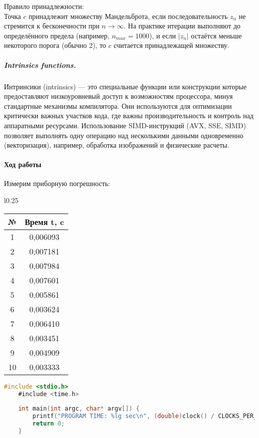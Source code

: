 \documentclass[12pt, letterpaper]{article}
\begin{document}
    Правило принадлежности:\\
    Точка $c$ принадлежит множеству Мандельброта, если последовательность $z_n$ не стремится к бесконечности при $n \to \infty$. На практике итерации выполняют до определённого предела (например, $n_{max} = 1000$), и если $\left| z_n \right|$ остаётся меньше некоторого порога (обычно 2), то $c$ считается принадлежащей множеству.

    \subparagraph{Intrinsics functions.}
    Интринсики (intrinsics) — это специальные функции или конструкции которые предоставляют низкоуровневый доступ к возможностям процессора, минуя стандартные механизмы компилятора. Они используются для оптимизации критически важных участков кода, где важны производительность и контроль над аппаратными ресурсами. Использование SIMD-инструкций (AVX, SSE, SIMD) позволяет выполнять одну операцию над несколькими данными одновременно (векторизация), например, обработка изображений и физические расчеты.

    \paragraph{Ход работы}
    Измерим приборную погрешность:\\
    \begin{wraptable}{l}{0.25\textwidth}
        \begin{tabular}{cc}  
        \toprule             %
        \textbf{№} & \textbf{Время t, c} \\
        \midrule             %
        1 & 0,006093 \\
        2 & 0,007181 \\
        3 & 0,007984 \\
        4 & 0,007601 \\
        5 & 0,005861 \\
        6 & 0,003624 \\
        7 & 0,006410 \\
        8 & 0,003451 \\
        9 & 0,004909 \\
        10 & 0,003333 \\
        \bottomrule          %
        \end{tabular}
    \end{wraptable}

    \begin{lstlisting}[language=C]
    #include <stdio.h>
    #include <time.h>
    
    int main(int argc, char* argv[]) {
        printf("PROGRAM TIME: %lg sec\n", (double)clock() / CLOCKS_PER_SEC);
        return 0;
    }
    \end{lstlisting}
    
\end{document}
